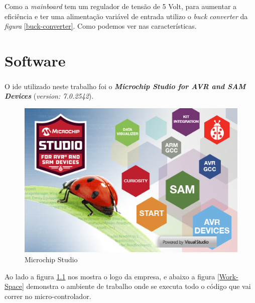 Como a \textit{mainboard} tem um regulador de tensão de 5 Volt, para aumentar a eficiência  e ter uma alimentação variável de entrada utilizo o \textit{buck converter} da \textit{figura} \ref{buck-converter}. Como podemos ver nas características.
\chapter{Software}
O \ac{ide} utilizado neste trabalho foi o \textbf{\textit{{Microchip Studio for AVR\textsuperscript{\textregistered} and SAM Devices}}} (\textit{version: 7.0.2542}).
\\
\begin{minipage}[!b]{.55\linewidth}
\begin{figure}[H]
	\captionsetup{justification=raggedright,singlelinecheck=false}
	\includegraphics[scale=0.6]{./image/PESTA/IDE/Microchip-Studio.png}
	\caption{Microchip Studio}
	\label{Microchip-Studio}
\end{figure}
\end{minipage}
\begin{minipage}[!b]{.45\linewidth}
	Ao lado a figura \ref{Microchip-Studio} nos mostra o logo da empresa, e abaixo a figura \ref{Work-Space} demonstra o ambiente de trabalho onde se executa todo o código que vai correr no micro-controlador.
	\\
	\\
	\\
	\\
	\\
\end{minipage}
